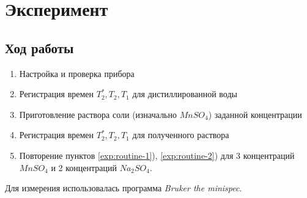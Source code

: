 \section{Эксперимент}
\subsection{Ход работы}
\begin{enumerate}
	\item Настройка и проверка прибора
	\item Регистрация времен $T_2^*, T_2, T_1$ для дистиллированной воды
	\item \label{exp:routine-1} Приготовление раствора соли (изначально $MnSO_4$) заданной концентрации
	\item \label{exp:routine-2} Регистрация времен $T_2^*, T_2, T_1$ для полученного раствора
	\item Повторение пунктов \ref{exp:routine-1}), \ref{exp:routine-2}) для 3 концентраций $MnSO_4$ и 2 концентраций $Na_2SO_4$.
\end{enumerate}
Для измерения использовалась программа \textit{Bruker the minispec}.